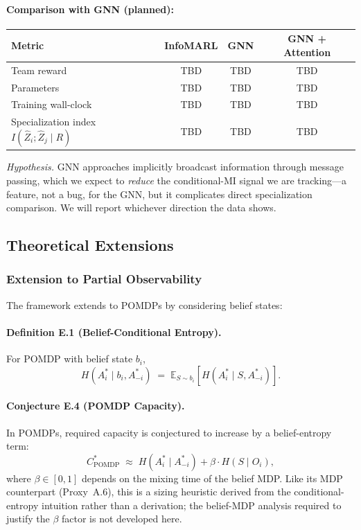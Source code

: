 \documentclass[10pt, letterpaper]{article}
\begin{document}
\paragraph{Comparison with GNN (planned):}

\begin{center}
\begin{tabular}{lccc}
\toprule
\textbf{Metric} & \textbf{InfoMARL} & \textbf{GNN} & \textbf{GNN + Attention} \\
\midrule
Team reward & TBD & TBD & TBD \\
Parameters  & TBD & TBD & TBD \\
Training wall-clock & TBD & TBD & TBD \\
Specialization index $I(\hat{Z}_i;\hat{Z}_j\mid R)$ & TBD & TBD & TBD \\
\bottomrule
\end{tabular}
\end{center}

\emph{Hypothesis.} GNN approaches implicitly broadcast information through message passing, which we expect to \emph{reduce} the conditional-MI signal we are tracking---a feature, not a bug, for the GNN, but it complicates direct specialization comparison. We will report whichever direction the data shows.

\subsection{Theoretical Extensions}

\subsubsection{Extension to Partial Observability}

The framework extends to POMDPs by considering belief states:

\paragraph{Definition E.1 (Belief-Conditional Entropy).} For POMDP with belief state $b_i$,
\[H(A_i^* \mid b_i, A_{-i}^*) \;=\; \mathbb{E}_{S \sim b_i}\!\left[ H(A_i^* \mid S, A_{-i}^*) \right].\]

\paragraph{Conjecture E.4 (POMDP Capacity).} In POMDPs, required capacity is conjectured to increase by a belief-entropy term:
\[C^*_{\text{POMDP}} \;\approx\; H(A_i^* \mid A_{-i}^*) + \beta \cdot H(S \mid O_i),\]
where $\beta \in [0,1]$ depends on the mixing time of the belief MDP. Like its MDP counterpart (Proxy~A.6), this is a sizing heuristic derived from the conditional-entropy intuition rather than a derivation; the belief-MDP analysis required to justify the $\beta$ factor is not developed here.
\end{document}
